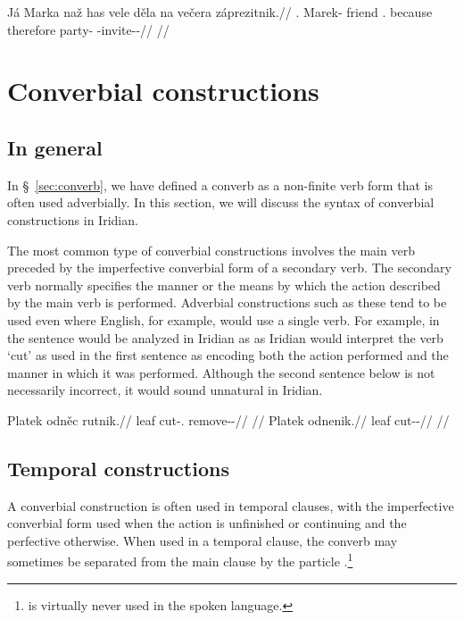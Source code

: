 \pex
\begingl
  \gla Já Marka naž has vele děla na večera záprezitnik.//
  \glb \Second{}\Sg{}.\Str{} Marek-\Acc{} friend \Cop.\Neg{} because therefore \Loc{} party-\Acc{} \Neg{}-invite-\Pv{}-\Pf{}//
  \glft {}//
\endgl
\xe




\section{Converbial constructions}\label{converbs-syntax}

\subsection{In general}

In \S~\ref{sec:converb}, we have defined a converb as a non-finite verb form
that is often used adverbially. In this section, we will discuss the syntax of
converbial constructions in Iridian.

The most common type of converbial constructions involves the main verb preceded
by the imperfective converbial form of a secondary verb. The secondary verb
normally specifies the manner or the means by which the action described by the
main verb is performed. Adverbial constructions such as these tend to be used
even where English, for example, would use a single verb. For example, in the
sentence  would be analyzed in Iridian as  as Iridian would interpret the verb `cut' as used
in the first sentence as encoding both the action performed and the manner in
which it was performed. Although the second sentence below is not necessarily
incorrect, it would sound unnatural in Iridian.

\pex
\a\begingl
  \gla Platek odněc rutnik.//
  \glb leaf cut-\Cv{}.\Ipf{} remove-\Pv{}-\Pf{}//
  \glft {}//
\endgl
\a\begingl
  \gla{}Platek odnenik.//
  \glb leaf cut-\Pv{}-\Pf{}//
  \glft {}//
\endgl
\xe

\subsection{Temporal constructions}

A converbial construction is often used in temporal clauses, with the imperfective converbial form used when the action is
unfinished or continuing and the perfective otherwise. When used in a temporal
clause, the converb may sometimes be separated from the main clause by the
particle .\footnote{ is virtually never used in the spoken
language.}

